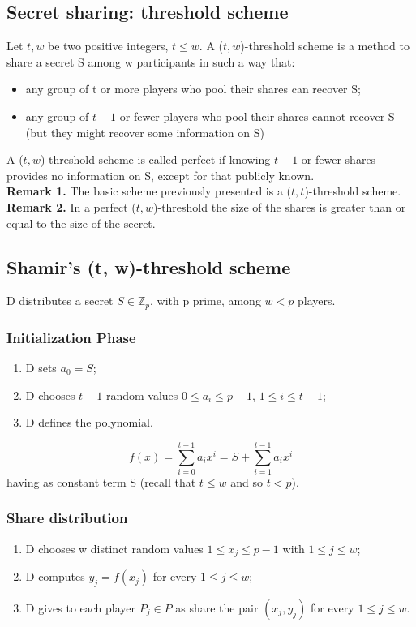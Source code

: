 \documentclass[a4paper, 10pt, titlepage]{article}
\begin{document}
\subsection{Secret sharing: threshold scheme}
Let $t, w$ be two positive integers, $t \leq w$. A ($t,w$)-threshold scheme is a method to share a secret S among w participants in such a way that:
\begin{itemize}
\item any group of t or more players who pool their shares can recover S;
\item any group of $t - 1$ or fewer players who pool their shares cannot recover S (but they might recover some information on S)
\end{itemize}
A ($t,w$)-threshold scheme is called perfect if knowing $t-1$ or fewer shares provides no information on S, except for that publicly known. \medskip\\
\textbf{Remark 1.} The basic scheme previously presented is a ($t,t$)-threshold scheme. \\
\textbf{Remark 2.} In a perfect ($t,w$)-threshold the size of the shares is greater than or equal to the size of the secret.

\subsection{Shamir's (t, w)-threshold scheme}
D distributes a secret $S \in \mathbb{Z}_p$, with p prime, among $w < p$ players.
\subsubsection*{Initialization Phase}
\begin{enumerate}
\item D sets $a_0 = S$;
\item D chooses $t - 1$ random values $0 \leq a_i \leq p - 1$, $1 \leq i \leq t - 1$;
\item D defines the polynomial.
\end{enumerate}
$$f(x) = \sum_{i=0}^{t-1} a_ix^i = S + \sum_{i=1}^{t-1}a_ix^i$$
having as constant term S (recall that $t \leq w$ and so $t < p$).
\subsubsection*{Share distribution}
\begin{enumerate}
\item D chooses w distinct random values $1 \leq x_j \leq p - 1$ with 
$1 \leq j \leq w$;
\item D computes $y_j = f (x_j)$ for every $1 \leq j \leq w$;
\item D gives to each player $P_j \in P$ as share the pair $(x_j, y_j)$ for every $1 \leq j \leq w$.
\end{enumerate}
\end{document}
